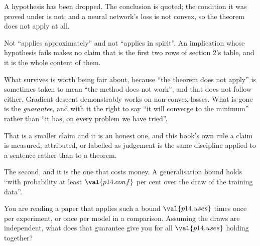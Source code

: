 \begin{fr}
\begin{ansblock}
A hypothesis has been dropped. The conclusion is quoted; the condition it was
proved under is not; and a neural network's loss is not convex, so the theorem
does not apply at all.
\end{ansblock}

Not \enquote{applies approximately} and not \enquote{applies in spirit}. An
implication whose hypothesis fails makes no claim \dash{} that is the first
two rows of section 2's table, and it is the whole content of them.

\begin{note}
What survives is worth being fair about, because \enquote{the theorem does not
apply} is sometimes taken to mean \enquote{the method does not work}, and that
does not follow either. Gradient descent demonstrably works on non-convex
losses. What is gone is the \emph{guarantee}, and with it the right to say
\enquote{it will converge to the minimum} rather than \enquote{it has, on
every problem we have tried}.

That is a smaller claim and it is an honest one, and this book's own rule
\dash{} a claim is measured, attributed, or labelled as judgement \dash{} is
the same discipline applied to a sentence rather than to a theorem.
\end{note}
\end{fr}

\begin{fr}
The second, and it is the one that costs money. A generalisation bound holds
\enquote{with probability at least $\val{p14.conf}$ per cent over the draw of
the training data}.

You are reading a paper that applies such a bound $\val{p14.uses}$ times
\dash{} once per experiment, or once per model in a comparison. Assuming the
draws are independent, what does that guarantee give you for all
$\val{p14.uses}$ holding together?
\dotline
\nextframe
\end{fr}

